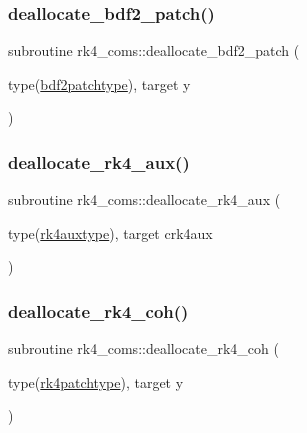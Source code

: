 \subsubsection{\texorpdfstring{deallocate\+\_\+bdf2\+\_\+patch()}{deallocate\_bdf2\_patch()}}
{\footnotesize\ttfamily subroutine rk4\+\_\+coms\+::deallocate\+\_\+bdf2\+\_\+patch (\begin{DoxyParamCaption}\item[{type(\hyperlink{structrk4__coms_1_1bdf2patchtype}{bdf2patchtype}), target}]{y }\end{DoxyParamCaption})}

\mbox{\label{namespacerk4__coms_a5af13b35af38a83aed0e367f7053ffc3}} 
\subsubsection{\texorpdfstring{deallocate\+\_\+rk4\+\_\+aux()}{deallocate\_rk4\_aux()}}
{\footnotesize\ttfamily subroutine rk4\+\_\+coms\+::deallocate\+\_\+rk4\+\_\+aux (\begin{DoxyParamCaption}\item[{type(\hyperlink{structrk4__coms_1_1rk4auxtype}{rk4auxtype}), target}]{crk4aux }\end{DoxyParamCaption})}

\mbox{\label{namespacerk4__coms_a56a9eb1fd462e81374c5993b69d3d05c}} 
\subsubsection{\texorpdfstring{deallocate\+\_\+rk4\+\_\+coh()}{deallocate\_rk4\_coh()}}
{\footnotesize\ttfamily subroutine rk4\+\_\+coms\+::deallocate\+\_\+rk4\+\_\+coh (\begin{DoxyParamCaption}\item[{type(\hyperlink{structrk4__coms_1_1rk4patchtype}{rk4patchtype}), target}]{y }\end{DoxyParamCaption})}

\mbox{\label{namespacerk4__coms_a14cd925b1b96d3da7c3b74351101e997}} 
